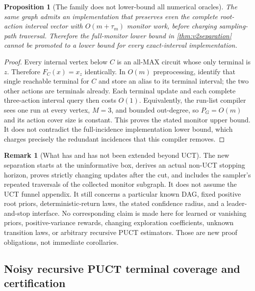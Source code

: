 \documentclass{article}
\theoremstyle{plain}
\newtheorem{proposition}[theorem]{Proposition}
\theoremstyle{definition}
\newtheorem{remark}[theorem]{Remark}
\begin{document}
\begin{proposition}[The family does not lower-bound all numerical oracles]
\label{prop:v2escape}
The same graph admits an implementation that preserves even the complete
root-action interval vector with $O(m+\tau_m)$ monitor work, before
charging sampling-path traversal. Therefore the full-monitor lower
bound in \cref{thm:v2separation} cannot be promoted to a lower bound
for every exact-interval implementation.
\end{proposition}
\begin{proof}
Every internal vertex below $C$ is an all-MAX circuit whose only terminal
is $z$. Therefore $F_C(x)=x_z$ identically. In $O(m)$ preprocessing,
identify that single reachable terminal for $C$ and store an alias to
its terminal interval; the two other actions are terminals already.
Each terminal update and each complete three-action interval query then
costs $O(1)$. Equivalently, the run-list compiler sees one run at every
vertex, $M=3$, and bounded out-degree, so $P_G=O(m)$ and its action
cover size is constant. This proves the stated monitor upper bound.
It does not contradict the full-incidence implementation lower bound,
which charges precisely the redundant incidences that this compiler
removes.
\end{proof}

\begin{remark}[What has and has not been extended beyond UCT]
The new separation starts at the uninformative box, derives an actual
non-UCT stopping horizon, proves strictly changing updates after the cut,
and includes the sampler's repeated traversals of the collected monitor
subgraph. It does not assume the UCT funnel appendix. It still concerns
a particular known DAG, fixed positive root priors, deterministic-return
laws, the stated confidence radius, and a leader-and-stop interface.
No corresponding claim is made here for learned or vanishing priors,
positive-variance rewards, changing exploration coefficients, unknown
transition laws, or arbitrary recursive PUCT estimators. Those are new
proof obligations, not immediate corollaries.
\end{remark}


\subsection{Noisy recursive PUCT terminal coverage and certification}
\label{app:noisy-puct-proofs}
\label{sec:v35scope}
\end{document}

